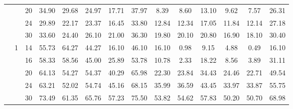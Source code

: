 \documentclass[num-refs]{wiley-article}
\begin{document}
\begin{table}
\begin{tabular}[t]{cccccccccccccc}
& & 20 & 34.90 & 29.68 & 24.97 & 17.71 & 37.97 & 8.39 & 8.60 & 13.10 & 9.62 & 7.57 & 26.31\\
& & 24 & 29.89 & 22.17 & 23.37 & 16.45 & 33.80 & 12.84 & 12.34 & 17.05 & 11.84 & 12.14 & 27.18\\
& & 30 & 33.60 & 24.40 & 26.10 & 21.00 & 36.30 & 19.80 & 20.10 & 20.80 & 16.90 & 18.10 & 30.40\\
\hline
 & 1 & 14 & 55.73 & 64.27 & 44.27 & 16.10 & 46.10 & 16.10 & 0.98 & 9.15 & 4.88 & 0.49 & 16.10\\
& & 16 & 58.33 & 58.56 & 45.00 & 25.89 & 53.78 & 10.78 & 2.33 & 18.22 & 8.56 & 3.89 & 31.11\\
& & 20 & 64.13 & 54.27 & 54.37 & 40.29 & 65.98 & 22.30 & 23.84 & 34.43 & 24.46 & 22.71 & 49.54\\
& & 24 & 63.21 & 52.02 & 54.74 & 45.16 & 68.15 & 35.99 & 36.59 & 43.45 & 33.97 & 33.87 & 55.75\\
& & 30 & 73.49 & 61.35 & 65.76 & 57.23 & 75.50 & 53.82 & 54.62 & 57.83 & 50.20 & 50.70 & 68.98\\
\hline
\end{tabular}
\label{sce1:power}
\end{table}
\end{document}
